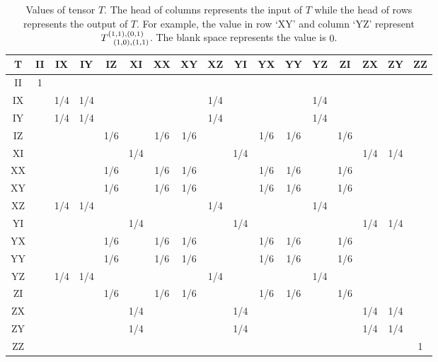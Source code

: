 \documentclass{article}
\begin{document}
\begin{table}[]
\begin{tabular}{|c|c|c|c|c|c|c|c|c|c|c|c|c|c|c|c|c|}
	\hline
	T  &II &IX &IY &IZ &XI &XX &XY &XZ &YI &YX &YY &YZ &ZI &ZX &ZY &ZZ \\ \hline
    II & 1 &   &   &   &   &   &   &   &   &   &   &   &   &   &   &   \\ \hline
    IX &   &1/4&1/4&   &   &   &   &1/4&   &   &   &1/4&   &   &   &   \\ \hline
    IY &   &1/4&1/4&   &   &   &   &1/4&   &   &   &1/4&   &   &   &   \\ \hline
    IZ &   &   &   &1/6&   &1/6&1/6&   &   &1/6&1/6&   &1/6&   &   &   \\ \hline
    XI &   &   &   &   &1/4&   &   &   &1/4&   &   &   &   &1/4&1/4&   \\ \hline
    XX &   &   &   &1/6&   &1/6&1/6&   &   &1/6&1/6&   &1/6&   &   &   \\ \hline
    XY &   &   &   &1/6&   &1/6&1/6&   &   &1/6&1/6&   &1/6&   &   &   \\ \hline
    XZ &   &1/4&1/4&   &   &   &   &1/4&   &   &   &1/4&   &   &   &   \\ \hline
    YI &   &   &   &   &1/4&   &   &   &1/4&   &   &   &   &1/4&1/4&   \\ \hline
    YX &   &   &   &1/6&   &1/6&1/6&   &   &1/6&1/6&   &1/6&   &   &   \\ \hline
    YY &   &   &   &1/6&   &1/6&1/6&   &   &1/6&1/6&   &1/6&   &   &   \\ \hline
    YZ &   &1/4&1/4&   &   &   &   &1/4&   &   &   &1/4&   &   &   &   \\ \hline
    ZI &   &   &   &1/6&   &1/6&1/6&   &   &1/6&1/6&   &1/6&   &   &   \\ \hline
    ZX &   &   &   &   &1/4&   &   &   &1/4&   &   &   &   &1/4&1/4&   \\ \hline
    ZY &   &   &   &   &1/4&   &   &   &1/4&   &   &   &   &1/4&1/4&   \\ \hline
    ZZ &   &   &   &   &   &   &   &   &   &   &   &   &   &   &   & 1 \\ \hline
		\end{tabular}
    \caption{Values of tensor $T$. The head of columns represents the input of $T$ while the head of rows represents the output of $T$. For example, the value in row `XY' and column `YZ' represent $T^{(1,1), (0,1)}_{~~(1,0), (1,1)}$.  The blank space represents the value is $0$.    }
\label{table: tensor T}
\end{table}
\end{document}
